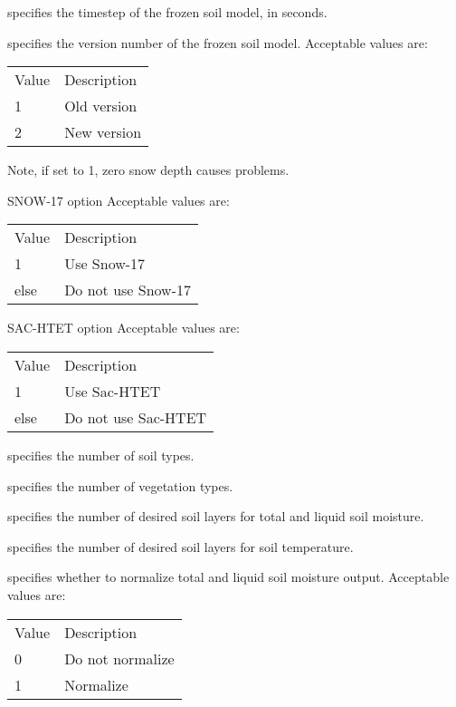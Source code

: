   specifies the timestep of the frozen
 soil model, in seconds.

  specifies the version number of
 the frozen soil model.
 Acceptable values are:

 \begin{tabular}{ll}
 Value & Description \\
 1     & Old version \\
 2     & New version \\
 \end{tabular}

 Note, if set to 1, zero snow depth causes problems.

  SNOW-17 option
 Acceptable values are:

 \begin{tabular}{ll}
 Value & Description        \\
 1     & Use Snow-17        \\
 else  & Do not use Snow-17 \\
 \end{tabular}

  SAC-HTET option
 Acceptable values are:

 \begin{tabular}{ll}
 Value & Description         \\
 1     & Use Sac-HTET        \\
 else  & Do not use Sac-HTET \\
 \end{tabular}

  specifies the number of soil types.

  specifies the number of vegetation types.

  specifies the number of desired soil
 layers for total and liquid soil moisture.

  specifies the number of desired soil
 layers for soil temperature.

  specifies whether to normalize total
 and liquid soil moisture output.
 Acceptable values are:

 \begin{tabular}{ll}
 Value & Description      \\
 0     & Do not normalize \\
 1     & Normalize        \\
 \end{tabular}


